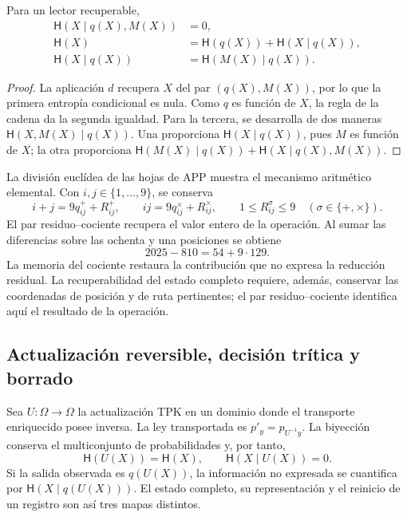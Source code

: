 \begin{proposition}
Para un lector recuperable,
\begin{align}
 \mathsf H(X\mid q(X),M(X))&=0,\\
 \mathsf H(X)&=\mathsf H(q(X))+\mathsf H(X\mid q(X)),\\
 \mathsf H(X\mid q(X))&=\mathsf H(M(X)\mid q(X)).
 \label{v:ant:eq:ii-kb-aut-fibra}
\end{align}
\end{proposition}
\begin{proof}
La aplicación \(d\) recupera \(X\) del par \((q(X),M(X))\),
por lo que la primera entropía condicional es nula. Como \(q\) es
función de \(X\), la regla de la cadena da la segunda igualdad.
Para la tercera, se desarrolla de dos maneras
\(\mathsf H(X,M(X)\mid q(X))\). Una proporciona
\(\mathsf H(X\mid q(X))\), pues \(M\) es función de \(X\);
la otra proporciona
\(\mathsf H(M(X)\mid q(X))+\mathsf H(X\mid q(X),M(X))\).
\end{proof}

La división euclídea de las hojas de APP muestra el mecanismo
aritmético elemental. Con \(i,j\in\{1,\ldots,9\}\), se conserva
\[
 i+j=9q^+_{ij}+R^+_{ij},\qquad
 ij=9q^\times_{ij}+R^\times_{ij},\qquad
 1\leq R^\sigma_{ij}\leq9\quad(\sigma\in\{+,\times\}).
\]
El par residuo--cociente recupera el valor entero de la operación.
Al sumar las diferencias sobre las ochenta y una posiciones se obtiene
\[
 2025-810=54+9\cdot129.
\]
La memoria del cociente restaura la contribución que no expresa la
reducción residual. La recuperabilidad del estado completo requiere,
además, conservar las coordenadas de posición y de ruta pertinentes;
el par residuo--cociente identifica aquí el resultado de la operación.

\subsection{Actualización reversible, decisión trítica y borrado}

Sea \(U:\Omega\to\Omega\) la actualización TPK en un dominio donde
el transporte enriquecido posee inversa. La ley transportada es
\(p'_y=p_{U^{-1}y}\). La biyección conserva el multiconjunto de
probabilidades y, por tanto,
\begin{equation}
 \mathsf H(U(X))=\mathsf H(X),\qquad
 \mathsf H(X\mid U(X))=0.
 \label{v:ant:eq:ii-kb-aut-reversible}
\end{equation}
Si la salida observada es \(q(U(X))\), la información no expresada
se cuantifica por \(\mathsf H(X\mid q(U(X)))\). El estado completo,
su representación y el reinicio de un registro son así tres mapas distintos.

